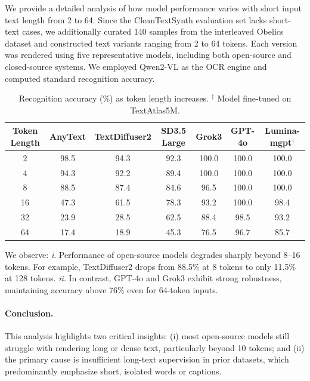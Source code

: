 We provide a detailed analysis of how model performance varies with  short input text length from 2 to 64. 
Since the CleanTextSynth evaluation set lacks short-text cases, we additionally curated 140 samples from the interleaved Obelics dataset and constructed text variants ranging from 2 to 64 tokens. Each version was rendered using five representative models, including both open-source and closed-source systems. We employed Qwen2-VL as the OCR engine and computed standard recognition accuracy. 

\begin{table}[h]
\centering
\small
\caption{Recognition accuracy (\%) as token length increases. 
$^\dagger$ Model fine-tuned on TextAtlas5M.}
\begin{tabular}{c|cccccc}
\toprule
\bf Token Length & \bf AnyText & \bf TextDiffuser2 & \bf SD3.5 Large & \bf Grok3 & \bf GPT-4o & \bf Lumina-mgpt$^\dagger$ \\
\midrule
2  & 98.5 & 94.3 & 92.3 & 100.0 & 100.0 & 100.0 \\
4  & 94.3 & 92.2 & 89.4 & 100.0 & 100.0 & 100.0 \\
8  & 88.5 & 87.4 & 84.6 & 96.5 & 100.0 & 100.0 \\
16 & 47.3 & 61.5 & 78.3 & 93.2 & 100.0 & 98.4 \\
32 & 23.9 & 28.5 & 62.5 & 88.4 & 98.5 & 93.2 \\
64 & 17.4 & 18.9 & 45.3 & 76.5 & 96.7 & 85.7 \\
\bottomrule
\end{tabular}
\end{table}

We observe: \emph{i}. Performance of open-source models degrades sharply beyond 8–16 tokens. For example, TextDiffuser2 drops from 88.5\% at 8 tokens to only 11.5\% at 128 tokens.  
\emph{ii}. In contrast, GPT-4o and Grok3 exhibit strong robustness, maintaining accuracy above 76\% even for 64-token inputs. 

\paragraph{Conclusion.} 
This analysis highlights two critical insights: (i) most open-source models still struggle with rendering long or dense text, particularly beyond 10 tokens; and (ii) the primary cause is insufficient long-text supervision in prior datasets, which predominantly emphasize short, isolated words or captions. 



